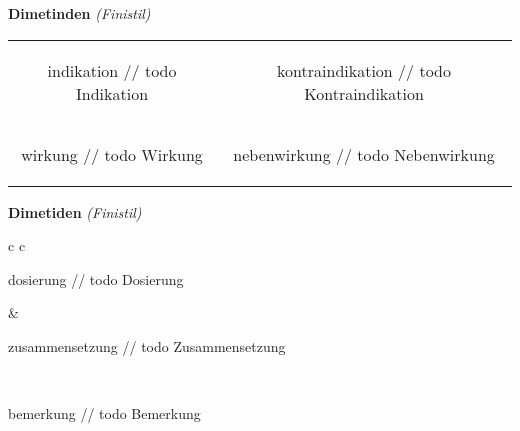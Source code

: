 \documentclass[12pt]{beamer}
\begin{document}
\begin{frame}{
    \textbf{Dimetinden}
    \textit{(Finistil)}
}
    \begin{tabular}{c c}
        \begin{beamercolorbox}[wd=\boxwidth\textwidth,ht=\boxheight\textheight,sep=1em]{indikation}
        // todo Indikation
        \end{beamercolorbox} & 
        \begin{beamercolorbox}[wd=\boxwidth\textwidth,ht=\boxheight\textheight,sep=1em]{kontraindikation}
        // todo Kontraindikation 
        \end{beamercolorbox} \\
        \begin{beamercolorbox}[wd=\boxwidth\textwidth,ht=\boxheight\textheight,sep=1em]{wirkung}
        // todo Wirkung
        \end{beamercolorbox} & 
        \begin{beamercolorbox}[wd=\boxwidth\textwidth,ht=\boxheight\textheight,sep=1em]{nebenwirkung}
        // todo Nebenwirkung
        \end{beamercolorbox} \\
    \end{tabular}
\end{frame}

\begin{frame}{
    \textbf{Dimetiden}
    \textit{(Finistil)}
}
    \begin{tabular}{c c}
        \begin{beamercolorbox}[wd=\boxwidth\textwidth,ht=\boxheight\textheight,sep=1em]{dosierung}
        // todo Dosierung
        \end{beamercolorbox} & 
        \begin{beamercolorbox}[wd=\boxwidth\textwidth,ht=\boxheight\textheight,sep=1em]{zusammensetzung}
        // todo Zusammensetzung
        \end{beamercolorbox} \\
        \begin{beamercolorbox}[wd=\textwidth,ht=\boxheight\textheight,sep=1em]{bemerkung}
        // todo Bemerkung
        \end{beamercolorbox} \\
    \end{tabular}
\end{frame}
\end{document}

